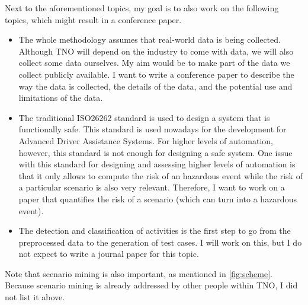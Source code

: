Next to the aforementioned topics, my goal is to also work on the following topics, which might result in a conference paper.
\begin{itemize}
	\item The whole methodology assumes that real-world data is being collected. Although TNO will depend on the industry to come with data, we will also collect some data ourselves. My aim would be to make part of the data we collect publicly available. I want to write a conference paper to describe the way the data is collected, the details of the data, and the potential use and limitations of the data.
	\item The traditional ISO26262 standard is used to design a system that is functionally safe. This standard is used nowadays for the development for Advanced Driver Assistance Systems. For higher levels of automation, however, this standard is not enough for designing a safe system. One issue with this standard for designing and assessing higher levels of automation is that it only allows to compute the risk of an hazardous event while the risk of a particular scenario is also very relevant. Therefore, I want to work on a paper that quantifies the risk of a scenario (which can turn into a hazardous event).
	\item The detection and classification of activities is the first step to go from the preprocessed data to the generation of test cases. I will work on this, but I do not expect to write a journal paper for this topic.
\end{itemize}

Note that scenario mining is also important, as mentioned in \cref{fig:scheme}. Because scenario mining is already addressed by other people within TNO, I did not list it above.
